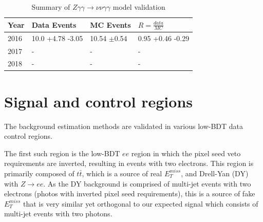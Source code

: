 \begin{table}[h]
	\centering
	\caption{Summary of $Z \gamma \gamma \rightarrow \nu \nu \gamma \gamma$ model validation}
	\begin{tabular}{|l|l|l|l|}
		\hline
		Year & Data Events & MC Events & $R = \frac{data}{MC}$ \\
		\hline
		\hline
		2016 & 10.0 +4.78 -3.05 & 10.54 $\pm$0.54 & 0.95 +0.46 -0.29 \\
		\hline
		2017 & - & - & - \\
		\hline
		2018 & - & - & - \\
		\hline
	\end{tabular}
	\label{table:ZGGtonunuGG}
\end{table}

\section{Signal and control regions}
The background estimation methods are validated in various low-BDT data control regions.  

The first such region is the low-BDT $ee$ region in which the pixel seed veto requirements are inverted, resulting in events with two electrons.  This region is primarily composed of $t\bar{t}$, which is a source of real $E_T^{miss}$, and Drell-Yan (DY) with $Z\rightarrow ee$.  As the DY background is comprised of multi-jet events with two electrons (photos with inverted pixel seed requirements), this is a source of fake $E_T^{miss}$ that is very similar yet orthogonal to our expected signal which consists of multi-jet events with two photons.